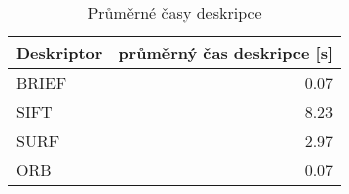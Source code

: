 \begin{table}[htbp]\centering
\begin{tabular}{ l| r }
	Deskriptor & průměrný čas deskripce [s] \\
	\hline
	 BRIEF & 0.07 \\
	 SIFT & 8.23 \\
	 SURF & 2.97 \\
	 ORB & 0.07
\end{tabular}
	\caption[Short Heading]{\protect Průměrné časy deskripce}\label{tab_desctimes}
\end{table}